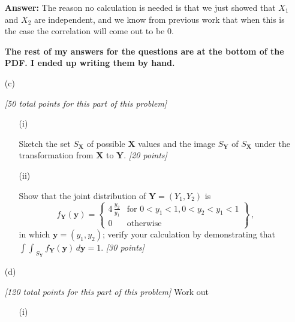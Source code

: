 \documentclass[12pt]{article}
\begin{document}
\begin{itemize}
\textbf{Answer:} The reason no calculation is needed is that we just showed that $X_1$ and $X_2$ are independent, and we know from previous work that when this is the case the correlation will come out to be 0. 

\textbf{The rest of my answers for the questions are at the bottom of the PDF. I ended up writing them by hand.}

\item[(c)]

\textit{[50 total points for this part of this problem]}

\begin{itemize}

\item[(i)]%

Sketch the set $S_{ \bm{ X } }$ of possible $\bm{ X }$ values and the image $S_{ \bm{ Y } }$ of $S_{ \bm{ X } }$ under the transformation from $\bm{ X }$ to $\bm{ Y }$.  \textit{[20 points]}



\item[(ii)]%

Show that the joint distribution of $\bm{ Y } = ( Y_1, Y_2 )$ is
\begin{equation} \label{e:toy-2}
f_{ \bm{ Y } } ( \bm{ y } ) = \left\{ \begin{array}{cc} 4 \, \frac{ y_2 }{ y_1 } & \text{for } 0 < y_1 < 1, 0 < y_2 < y_1 < 1 \\ 0 & \text{otherwise} \end{array} \right\} \, ,
\end{equation}
in which $\bm{ y } = ( y_1, y_2 )$; verify your calculation by demonstrating that ${\int \! \! \int}_{ S_{ \bm{ Y } } } \, f_{ \bm{ Y } } ( \bm{ y } ) \, d \bm{ y } = 1$. \textit{[30 points]}

\end{itemize}
\newpage

\item[(d)]

\textit{[120 total points for this part of this problem]} Work out 

\begin{itemize}

\item[(i)]%


\end{itemize}
\end{itemize}
\end{document}
